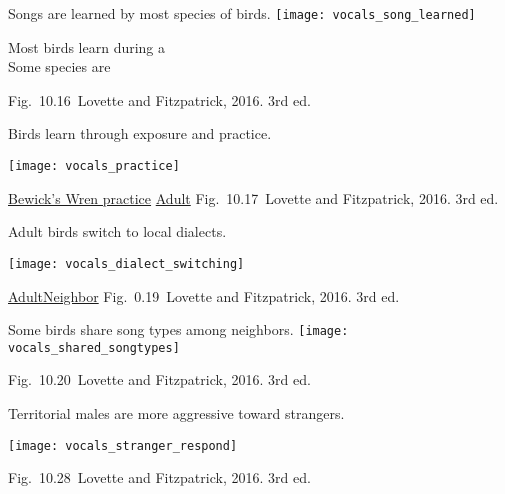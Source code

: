 \documentclass[t]{beamer}
\newcommand{\cornell}[1]{Fig.~#1~Lovette and Fitzpatrick, 2016. 3rd ed.}
\newcommand{\backskip}{\vspace{-0.5\baselineskip}}
\begin{document}

\begin{frame}{Songs are learned by most species of birds.}
\texttt{[image: vocals\_song\_learned]}

\hangpara Most birds learn during a \\ Some species are 

\vfilll

\tinyfill \cornell{10.16}
\end{frame}


\begin{frame}{Birds learn through exposure and practice.}

\texttt{[image: vocals\_practice]}

\vfilll

\tiny \href{https://youtu.be/gVYpcFAcpLo}{Bewick's Wren practice} 
\quad
\href{https://youtu.be/bCQVNalg93Y}{Adult} \hfill  \cornell{10.17}
\end{frame}


\begin{frame}{Adult birds switch to local dialects.}
\backskip

\centering

\texttt{[image: vocals\_dialect\_switching]}

\vfilll

\tiny \href{https://youtu.be/q7P3LX0V1DQ}{Adult}\quad\href{https://youtu.be/lP7sfF9mzCU}{Neighbor} \hfill \cornell{0.19}
\end{frame}


\begin{frame}{Some birds share song types among neighbors.}
\centering
\texttt{[image: vocals\_shared\_songtypes]}

\vfilll

\tinyfill \cornell{10.20}
\end{frame}


\begin{frame}{Territorial males are more aggressive toward strangers.}

\backskip
\centering 
\texttt{[image: vocals\_stranger\_respond]}

\vfilll

\tinyfill \cornell{10.28}
\end{frame}
\end{document}

